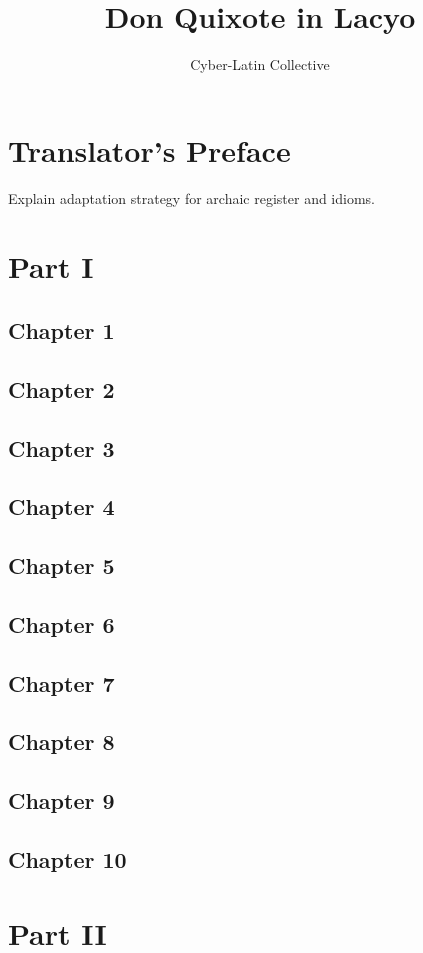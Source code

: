 \documentclass[12pt]{book}
\title{Don Quixote in Lacyo}
\author{Cyber-Latin Collective}
\date{}
\begin{document}
\maketitle
\tableofcontents

\chapter{Translator's Preface}
Explain adaptation strategy for archaic register and idioms.

\chapter{Part I}
\section{Chapter 1}
\section{Chapter 2}
\section{Chapter 3}
\section{Chapter 4}
\section{Chapter 5}
\section{Chapter 6}
\section{Chapter 7}
\section{Chapter 8}
\section{Chapter 9}
\section{Chapter 10}

\chapter{Part II}
\end{document}
